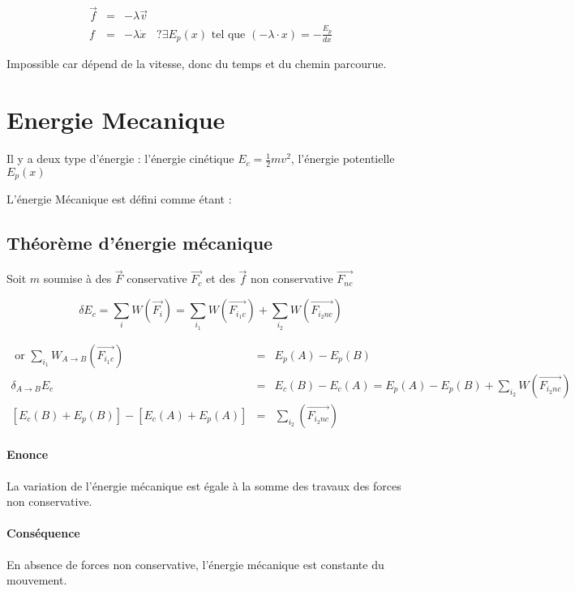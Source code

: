 \[\begin{array}{rclr}
	\vec{f} &=& -\lambda \vec{v} \\
	f &=& -\lambda \dot{x} & ? \exists E_p(x) \text{ tel que } (-\lambda \cdot{x}) = -\frac{E_p}{dx}
\end{array}\]

Impossible car dépend de la vitesse, donc du temps et du chemin parcourue.

\section{Energie Mecanique}

Il y a deux type d'énergie : l'énergie cinétique $E_c = \frac{1}{2}mv^2$, l'énergie potentielle $E_p(x)$

L'énergie Mécanique est défini comme étant : 
\begin{center}
\end{center}

\subsection{Théorème d'énergie mécanique}
Soit $m$ soumise à des $\vec{F}$ conservative $\vec{F_c}$ et des $\vec{f}$ non conservative $\vec{F_{nc}}$

\[\delta E_c = \sum_i W(\vec{F_i}) = \sum_{i_1} W(\vec{F_{i_1c}}) + \sum_{i_2} W(\vec{F_{i_2 nc}})\]

\[\begin{array}{rcl}
\text{ or } \sum_{i_1}W_{A \to B}(\vec{F_{i_1c}}) &=& E_p(A)-E_p(B) \\
\delta_{A \to B} E_c &=& E_c(B) - E_c(A) = E_p(A)-E_p(B) + \sum_{i_2} W(\vec{F_{i_2 nc}}) \\
{[E_c(B) + E_p(B)]} - {[E_c(A) + E_p(A)]} &=& \sum_{i_2} (\vec{F_{i_2nc}})\end{array}\]

\paragraph{Enonce} La variation de l'énergie mécanique est égale à la somme des travaux des forces non conservative.

\begin{center}
\end{center}

\paragraph{Conséquence} En absence de forces non conservative, l'énergie mécanique est constante du mouvement.

